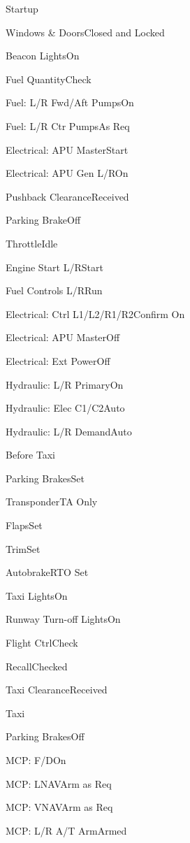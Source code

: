 \documentclass[sim-use, halfpage]{checklist}
\begin{document}
\begin{checklist}{Startup}
  \item{Windows \& Doors}{Closed and Locked}
  \item{Beacon Lights}{On}
  \item{Fuel Quantity}{Check}
  \item{Fuel: L/R Fwd/Aft Pumps}{On}
  \item{Fuel: L/R Ctr Pumps}{As Req}
  \item{Electrical: APU Master}{Start}
  \item{Electrical: APU Gen L/R}{On}
  \item{Pushback Clearance}{Received}
  \item{Parking Brake}{Off}
  \item{Throttle}{Idle}
  \item{Engine Start L/R}{Start}
  \item{Fuel Controls L/R}{Run}
  \item{Electrical: Ctrl L1/L2/R1/R2}{Confirm On}
  \item{Electrical: APU Master}{Off}
  \item{Electrical: Ext Power}{Off}
  \item{Hydraulic: L/R Primary}{On}
  \item{Hydraulic: Elec C1/C2}{Auto}
  \item{Hydraulic: L/R Demand}{Auto}
\end{checklist}

\begin{checklist}{Before Taxi}
  \item{Parking Brakes}{Set}
  \item{Transponder}{TA Only}
  \item{Flaps}{Set}
  \item{Trim}{Set}
  \item{Autobrake}{RTO Set}
  \item{Taxi Lights}{On}
  \item{Runway Turn-off Lights}{On}
  \item{Flight Ctrl}{Check}
  \item{Recall}{Checked}
  \item{Taxi Clearance}{Received}
\end{checklist}

\begin{checklist}{Taxi}
  \item{Parking Brakes}{Off}
  \item{MCP: F/D}{On}
  \item{MCP: LNAV}{Arm as Req}
  \item{MCP: VNAV}{Arm as Req}
  \item{MCP: L/R A/T Arm}{Armed}
\end{checklist}
\end{document}
